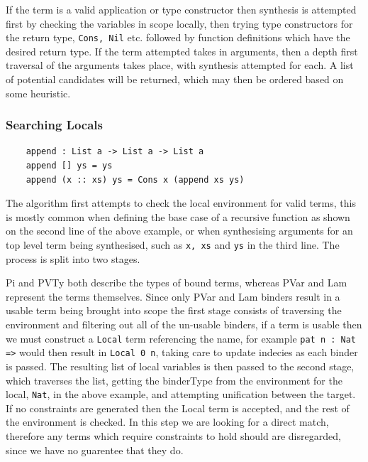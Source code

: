 \documentclass[a4paper]{article}
\begin{document}
If the term is a valid application or type constructor then synthesis is attempted first by checking the  variables in scope locally, then
trying type constructors for the return type, \texttt{Cons, Nil} etc. followed by function definitions which have the desired return type. If the term attempted takes in arguments, then a depth first traversal
of the arguments takes place, with synthesis attempted for each.
A list of potential candidates will be returned, which may then be
ordered based on some heuristic.

\subsubsection{Searching Locals}
\label{sec:orgbc2d082}

\begin{center}
  \begin{verbatim}
    append : List a -> List a -> List a
    append [] ys = ys
    append (x :: xs) ys = Cons x (append xs ys) 
  \end{verbatim}
\end{center}

The algorithm first attempts to check the local environment for valid
terms, this is mostly common when defining the base case of a
recursive function as shown on the second line of the above example,
or when synthesising arguments for an top level term being synthesised,
such as \texttt{x, xs} and \texttt{ys} in the third line. 
The process is split into two stages. 

Pi and PVTy both describe the types of bound terms, whereas PVar and
Lam represent the terms themselves. Since only PVar and Lam binders
result in a usable term being brought into scope the first stage
consists of traversing the environment and filtering out all of the
un-usable binders, if a term is usable then we must construct a
\texttt{Local} term referencing the name, for example
\texttt{pat n : Nat =>} would then result in \texttt{Local 0 n},
taking care to update indecies as each
binder is passed. The resulting list of local variables is then passed to the
second stage, which traverses the list, getting the binderType from the environment for the local,
\texttt{Nat}, in the above example, and attempting unification between the target.
If no constraints are generated then the Local term is accepted, and
the rest of the environment is checked. In this step we are looking for a direct match,
therefore any terms which require constraints to hold should are disregarded, since we have
no guarentee that they do. 
\end{document}
